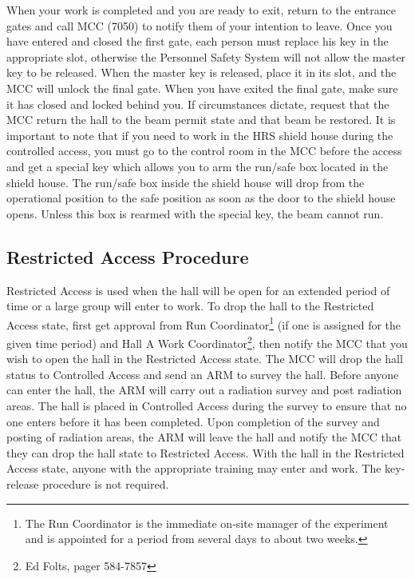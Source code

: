 When your work is completed and you are ready to exit, return to the
entrance gates and call MCC (7050) to notify them of your intention to leave.
 Once you have entered and closed the first gate, each person must
replace his key in the appropriate slot, otherwise the Personnel
Safety System will not allow the master key to be released. When the
master key is released, place it in its slot, and the MCC will unlock
the final gate. When you have exited the final gate, make sure it has
closed and locked behind you. If circumstances dictate, request that
the MCC return the hall to the beam permit state and that beam be
restored.  It is important to note that if you need to work in the HRS
shield house during the controlled access, you must go to the control
room in the MCC before the access and get a special key which allows
you to arm the run/safe box located in the shield house. The run/safe
box inside the shield house will drop from the operational position to
the safe position as soon as the door to the shield house
opens. Unless this box is rearmed with the special key, the beam
cannot run.

\begin{safetyen}{10}{10}
\subsection{Restricted Access Procedure} 
\end{safetyen}

Restricted Access is used when the hall will be open for an extended
period of time or a large group will enter to work. 
To drop the hall
to the Restricted Access state, first get approval from Run 
Coordinator\footnote{The Run Coordinator is the immediate on-site
manager of the experiment and is appointed for a period from
several days to about two weeks.}
(if one is assigned for the given time period)
and Hall A Work Coordinator\footnote{Ed Folts, pager 584-7857},
then notify the MCC that you wish to
open the hall in the Restricted Access state. The MCC will drop the
hall status to Controlled Access and send an ARM to survey the
hall. Before anyone can enter the hall, the ARM will carry out a
radiation survey and post radiation areas.  The hall is placed in
Controlled Access during the survey to ensure that no one enters
before it has been completed. Upon completion of the survey and
posting of radiation areas, the ARM will leave the hall and notify the
MCC that they can drop the hall state to Restricted Access. With the
hall in the Restricted Access state, anyone with the appropriate
training may enter and work.  The key- release procedure is not
required.
 
